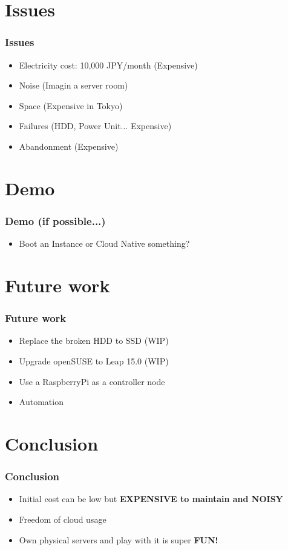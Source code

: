 \documentclass[aspectratio=169,11pt,hyperref={colorlinks=true}]{beamer}
\begin{document}
\section{Issues}
\begin{frame}
  \frametitle{Issues}
  \begin{itemize}
    \item Electricity cost: 10,000 JPY/month (Expensive)
    \item Noise (Imagin a server room)
    \item Space (Expensive in Tokyo)
    \item Failures (HDD, Power Unit... Expensive)
    \item Abandonment (Expensive)
  \end{itemize}
\end{frame}

\section{Demo}
\begin{frame}
  \frametitle{Demo (if possible...)}
  \begin{itemize}
    \item Boot an Instance or Cloud Native something?
  \end{itemize}
\end{frame}

\section{Future work}
\begin{frame}
  \frametitle{Future work}
  \begin{itemize}
    \item Replace the broken HDD to SSD (WIP)
    \item Upgrade openSUSE to Leap 15.0 (WIP)
    \item Use a RaspberryPi as a controller node
    \item Automation
  \end{itemize}
\end{frame}

\section{Conclusion}
\begin{frame}
  \frametitle{Conclusion}
  \begin{itemize}
    \item Initial cost can be low but \bf{EXPENSIVE} to maintain and \bf{NOISY}
    \item Freedom of cloud usage
    \item Own physical servers and play with it is super \bf{FUN}!
  \end{itemize}
\end{frame}
\end{document}
